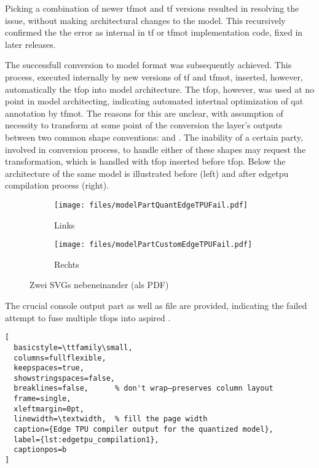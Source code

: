 {Picking a combination of newer \gls{tfmot} and \gls{tf} versions resulted in resolving the issue, without making architectural changes to the model.
This recursively confirmed the the error as internal in \gls{tf} or \gls{tfmot} implementation code, fixed in later releases.

The successfull conversion to  model format was subsequently achieved. This process, executed internally by new versions of \gls{tf} and \gls{tfmot},
inserted, however, automatically the  \gls{tfop} into model architecture. The  \gls{tfop}, however, was used at no point in model architecting,
indicating automated intertnal optimization of \gls{qat} annotation by \gls{tfmot}. The reasons for this are unclear,
with assumption of necessity to transform at some point of the conversion the layer's outputs between two common shape conventions:
 and . The inability of a certain party, involved in conversion process,
to handle either of these shapes may request the transformation,
which is handled with  \gls{tfop} inserted before  \gls{tfop}. Below the architecture of the same model is illustrated before (left)
and after \gls{edgetpu} compilation process (right).

\begin{figure}[H]
  \centering
  \begin{subfigure}[t]{0.48\textwidth}
    \centering
    \texttt{[image: files/modelPartQuantEdgeTPUFail.pdf]}
    \caption{Links}
  \end{subfigure}
  \hfill
  \begin{subfigure}[t]{0.48\textwidth}
    \centering
    \texttt{[image: files/modelPartCustomEdgeTPUFail.pdf]}
    \caption{Rechts}
  \end{subfigure}
  \caption{Zwei SVGs nebeneinander (als PDF)}
\end{figure}

The crucial console output part as well as  file are provided, indicating the failed attempt to fuse multiple \glspl{tfop} into aspired .

\begin{lstlisting}[
  basicstyle=\ttfamily\small,
  columns=fullflexible,
  keepspaces=true,
  showstringspaces=false,
  breaklines=false,      % don't wrap—preserves column layout
  frame=single,
  xleftmargin=0pt,
  linewidth=\textwidth,  % fill the page width
  caption={Edge TPU compiler output for the quantized model},
  label={lst:edgetpu_compilation1},
  captionpos=b
]


\end{lstlisting}}
